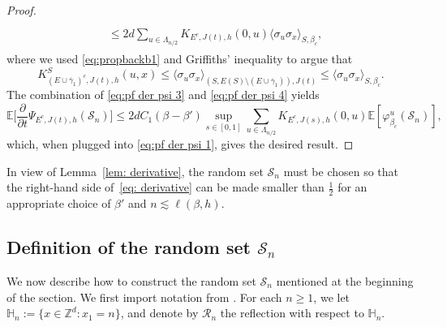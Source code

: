 \documentclass[10pt,a4paper]{amsart}
\numberwithin{equation}{section}
\begin{document}
\begin{proof}
\begin{align}
\begin{aligned}
\\&\leq 2d\sum_{u\in \Lambda_{n/2}}K_{E^c,J(t),h}(0,u)\langle \sigma_u\sigma_x\rangle_{S,\beta_c},
\end{aligned}
\end{align}
where we used \eqref{eq:propbackb1} and Griffiths' inequality to argue that \begin{equation}
K_{(E\cup\overline{\gamma}_1)^c,J(t),h}^S(u,x)\leq\langle \sigma_{u}\sigma_x\rangle_{(S,E(S)\setminus(E\cup\overline{\gamma}_1)),J(t)} \leq \langle \sigma_u\sigma_x\rangle_{S,\beta_c}.
\end{equation}
The combination of \eqref{eq:pf der psi 3} and \eqref{eq:pf der psi 4} yields
\begin{equation}
	\mathbb E\Big[\frac{\partial}{\partial t}\Psi_{E^c,J(t),h}(\mathcal S_n)\Big]\leq 2dC_1(\beta-\beta') \sup_{s\in [0,1]} \sum_{u\in \Lambda_{n/2}}K_{E^c,J(s),h}(0,u)\mathbb E[\varphi_{\beta_c}^u(\mathcal S_n)],
\end{equation}
which, when plugged into \eqref{eq:pf der psi 1}, gives the desired result.
\end{proof}


In view of Lemma~\ref{lem: derivative}, the random set $\mathcal{S}_n$ 
must be chosen so that the right-hand side of~\eqref{eq: derivative} can 
be made smaller than $\tfrac{1}{2}$ for an appropriate choice of $\beta'$ and $n\lesssim\ell(\beta,h)$.


\subsection{Definition of the random set $\mathcal S_n$}\label{sec:definition of S_n}


We now describe how to construct the random set $\mathcal S_n$ mentioned at the beginning of the section. We first import notation from \cite{AizenmanDuminilTassionWarzelEmergentPlanarity2019,DuminilPanis2024newLB}. For each $n\geq 1$, we let $\mathbb H_n:=\{x\in \mathbb Z^d: x_1=n\}$, and denote by $\mathcal R_n$ the reflection with respect to $\mathbb H_n$. 
\end{document}
